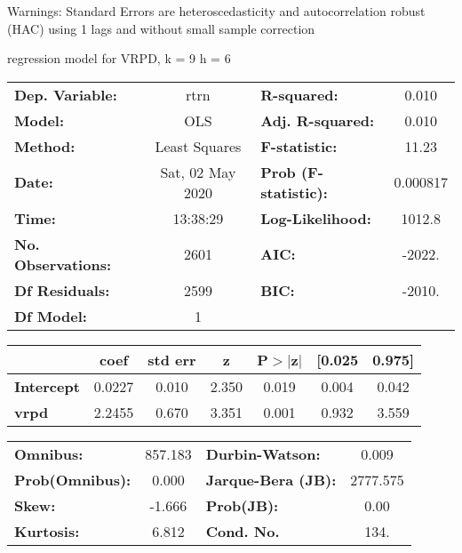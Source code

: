 Warnings: \newline
 [1] Standard Errors are heteroscedasticity and autocorrelation robust (HAC) using 1 lags and without small sample correction\ 

regression model for VRPD, k = 9 h = 6\begin{center}
\begin{tabular}{lclc}
\toprule
\textbf{Dep. Variable:}    &       rtrn       & \textbf{  R-squared:         } &     0.010   \\
\textbf{Model:}            &       OLS        & \textbf{  Adj. R-squared:    } &     0.010   \\
\textbf{Method:}           &  Least Squares   & \textbf{  F-statistic:       } &     11.23   \\
\textbf{Date:}             & Sat, 02 May 2020 & \textbf{  Prob (F-statistic):} &  0.000817   \\
\textbf{Time:}             &     13:38:29     & \textbf{  Log-Likelihood:    } &    1012.8   \\
\textbf{No. Observations:} &        2601      & \textbf{  AIC:               } &    -2022.   \\
\textbf{Df Residuals:}     &        2599      & \textbf{  BIC:               } &    -2010.   \\
\textbf{Df Model:}         &           1      & \textbf{                     } &             \\
\bottomrule
\end{tabular}
\begin{tabular}{lcccccc}
                   & \textbf{coef} & \textbf{std err} & \textbf{z} & \textbf{P$> |$z$|$} & \textbf{[0.025} & \textbf{0.975]}  \\
\midrule
\textbf{Intercept} &       0.0227  &        0.010     &     2.350  &         0.019        &        0.004    &        0.042     \\
\textbf{vrpd}      &       2.2455  &        0.670     &     3.351  &         0.001        &        0.932    &        3.559     \\
\bottomrule
\end{tabular}
\begin{tabular}{lclc}
\textbf{Omnibus:}       & 857.183 & \textbf{  Durbin-Watson:     } &    0.009  \\
\textbf{Prob(Omnibus):} &   0.000 & \textbf{  Jarque-Bera (JB):  } & 2777.575  \\
\textbf{Skew:}          &  -1.666 & \textbf{  Prob(JB):          } &     0.00  \\
\textbf{Kurtosis:}      &   6.812 & \textbf{  Cond. No.          } &     134.  \\
\bottomrule
\end{tabular}
\end{center}

